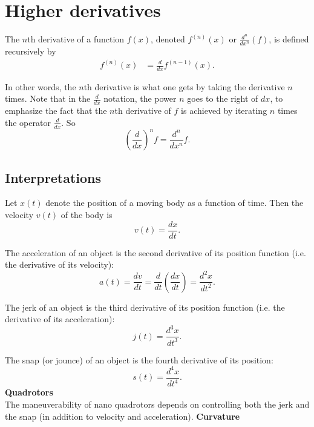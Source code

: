\documentclass[twoside,openright,titlepage,a4paper]{book}
\begin{document}
\begin{sloppypar}
\section{Higher derivatives} \label{ChDifferentiationSecHigherDerivatives}

The $n$th derivative of a function $f(x)$, denoted $f^{\left(n\right)}(x)$ or $\frac{d^n}{dx^n}(f)$, is defined recursively by
\begin{align*}
f^{\left(n\right)}(x) &= \frac{d}{dx}f^{\left(n-1\right)}(x). 
\end{align*}

In other words, the $n$th derivative is what one gets by taking the derivative $n$ times. Note that in the $\frac{d}{dx}$ notation, the power $n$ goes to the right of $dx$, to emphasize the fact that the $n$th derivative of $f$ is achieved by iterating $n$ times the operator $\frac{d}{dx}$. So \[ \left( \frac{d}{dx}\right)^n f = \frac{d^n}{dx^n} f. \]

\subsection{Interpretations}

Let $x(t)$ denote the position of a moving body as a function of time. Then the velocity $v(t)$ of the body is \[ v(t) = \frac{dx}{dt}. \]

The acceleration of an object is the second derivative of its position function (i.e. the derivative of its velocity): \[ a(t) = \frac{dv}{dt} = \frac{d}{dt}\left(\frac{dx}{dt}\right) = \frac{d^2x}{dt^2}. \]

The jerk of an object is the third derivative of its position function (i.e. the derivative of its acceleration): \[ j(t) = \frac{d^3x}{dt^3}. \]

The snap (or jounce) of an object is the fourth derivative of its position: \[ s(t) = \frac{d^4x}{dt^4}. \]
\bigbreak
\textbf{Quadrotors}\\

The maneuverability of nano quadrotors depends on controlling both the jerk and the snap (in addition to velocity and acceleration).
\bigbreak
\textbf{Curvature}\\


\end{sloppypar}
\end{document}
